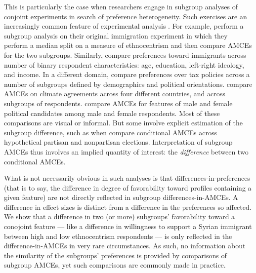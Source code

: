 \documentclass[a4paper,12pt]{article}\usepackage[]{graphicx}\usepackage[]{color}
\begin{document}
This is particularly the case when researchers engage in subgroup analyses of conjoint experiments in search of preference heterogeneity. Such exercises are an increasingly common feature of experimental analysis \citep{GreenKern2012, RatkovicTingley2017, GrimmerMessingWestwood2017, EgamiImai2018}. For example, \citet{HainmuellerHopkinsYamamoto2014} perform a subgroup analysis on their original immigration experiment in which they perform a median split on a measure of ethnocentrism and then compare AMCEs for the two subgroups. Similarly, \citet{BansakHainmuellerHangartner2016} compare preferences toward immigrants across number of binary respondent characteristics: age, education, left-right ideology, and income. In a different domain, \citet{BallardRosaMartinScheve2016} compare preferences over tax policies across a number of subgroups defined by demographics and political orientations. \citet{BechtelScheve2013} compare AMCEs on climate agreements across four different countries, and across subgroups of respondents. \citet{TeeleKallaRosenbluth2018} compare AMCEs for features of male and female political candidates among male and female respondents. Most of these comparisons are visual or informal. But some involve explicit estimation of the subgroup difference, such as when \citet{KirklandCoppock2017} compare conditional AMCEs across hypothetical partisan and nonpartisan elections. Interpretation of subgroup AMCEs thus involves an implied quantity of interest: the \textit{difference} between two conditional AMCEs.

What is not necessarily obvious in such analyses is that differences-in-preferences (that is to say, the difference in degree of favorability toward profiles containing a given feature) are not directly reflected in subgroup differences-in-AMCEs. A difference in effect sizes is distinct from a difference in the preferences so affected. We show that a difference in two (or more) subgroups' favorability toward a conojoint feature --- like a difference in willingness to support a Syrian immigrant between high and low ethnocentrism respondents --- is only reflected in the difference-in-AMCEs in very rare circumstances. As such, no information about the similarity of the subgroups' preferences is provided by comparisons of subgroup AMCEs, yet such comparisons are commonly made in practice.
\end{document}
